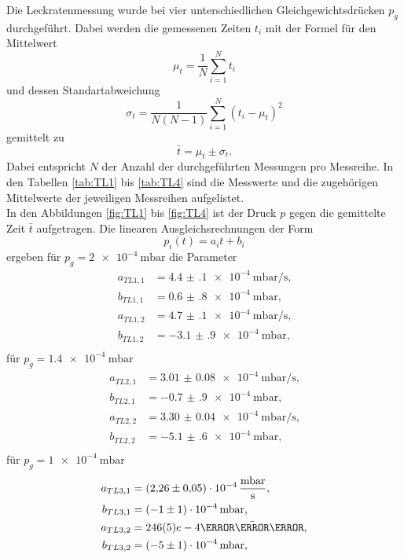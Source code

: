 Die Leckratenmessung wurde bei vier unterschiedlichen Gleichgewichtsdrücken $p_g$ durchgeführt. Dabei werden die gemessenen Zeiten $t_i$ mit der Formel für den Mittelwert
\begin{equation}
\mu_t = \frac{1}{N}\sum_{i=1}^{N}t_i
\end{equation} 
und dessen Standartabweichung
\begin{equation}
\sigma_t = \frac{1}{N(N-1)}\sum_{i=1}^{N}(t_i-\mu_t)^2
\end{equation} 
gemittelt zu
\begin{equation}
\bar{t} = \mu_t\pm \sigma_t\text{.}
\end{equation} 
Dabei entspricht $N$ der Anzahl der durchgeführten Messungen pro Messreihe.
In den Tabellen \ref{tab:TL1} bis \ref{tab:TL4} sind die Messwerte und die zugehörigen Mittelwerte der jeweiligen Messreihen aufgelistet.\\
In den Abbildungen \ref{fig:TL1} bis \ref{fig:TL4} ist der Druck $p$ gegen die gemittelte Zeit $\bar{t}$ aufgetragen. Die linearen Ausgleichsrechnungen der Form
\[
p_i(t) = a_it+b_i
\]
ergeben für $p_g = \SI{2e-4}{\milli\bar}$ die Parameter
\begin{align*}
a_{TL1,1} &= \SI{4.4(1)e-4}{\milli\bar\per\second} \text{,}\\
b_{TL1,1} &= \SI{0.6(8)e-4}{\milli\bar} \text{,}\\
a_{TL1,2} &= \SI{4.7(1)e-4}{\milli\bar\per\second} \text{,}\\
b_{TL1,2} &= \SI{-3.1(9)e-4}{\milli\bar} \text{,}\\
\end{align*}
für $p_g = \SI{1.4e-4}{\milli\bar}$
\begin{align*}
a_{TL2,1} &= \SI{3.01(8)e-4}{\milli\bar\per\second} \text{,}\\
b_{TL2,1} &= \SI{-0.7(9)e-4}{\milli\bar} \text{,}\\
a_{TL2,2} &= \SI{3.30(4)e-4}{\milli\bar\per\second} \text{,}\\
b_{TL2,2} &= \SI{-5.1(6)e-4}{\milli\bar} \text{,}\\
\end{align*}
für $p_g = \SI{1e-4}{\milli\bar}$
\begin{align*}
a_{TL3,1} &= \SI{2.26(5)e-4}{\milli\bar\per\second} \text{,}\\
b_{TL3,1} &= \SI{-1(1)e-4}{\milli\bar} \text{,}\\
a_{TL3,2} &= \SI2.46(5)e-4{\milli\bar\per\second} \text{,}\\
b_{TL3,2} &= \SI{-5(1)e-4}{\milli\bar} \text{,}\\
\end{align*}
